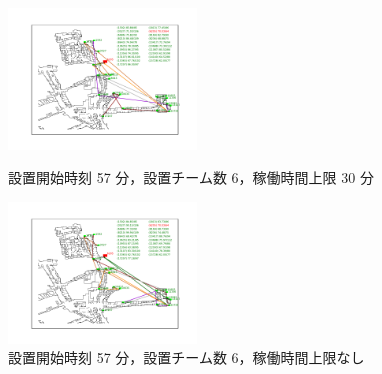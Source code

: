 \documentclass[a4paper,12pt,fleqn]{jarticle}
\begin{document}
\begin{figure}
 \begin{center}
  \begin{minipage}{0.49\hsize}
   \begin{center}
    \includegraphics[width=5cm,trim=100 50 100 50]{fig/57min_6team_lim30min.pdf}
    \caption{設置開始時刻 57 分，\newline \quad 設置チーム数 6，稼働時間上限 30 分}
    \label{fig:57min_6team_lim30min}
   \end{center}
  \end{minipage}
  \begin{minipage}{0.49\hsize}
   \begin{center}
    \includegraphics[width=5cm,trim=100 50 100 50]{fig/57min_6team_nolim.pdf}
    \caption{設置開始時刻 57 分，\newline \quad 設置チーム数 6，稼働時間上限なし}
    \label{fig:57min_6team_nolim}
   \end{center}
  \end{minipage}
 \end{center}
\end{figure}
\end{document}
